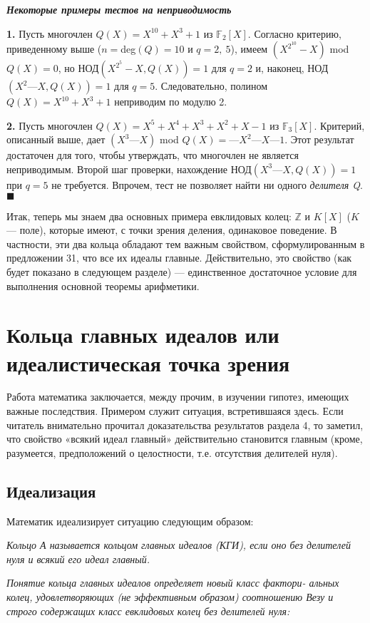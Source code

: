 \documentclass{mai_book}
\begin{document}
\noindent\textbf{\textit{Некоторые примеры тестов на неприводимость}}

\textbf{1.} Пусть многочлен $Q(X) = X^{10} + X^3 + 1$ из $\mathbb{F}_2[X]$. Согласно  
критерию, приведенному выше ($n = $deg$(Q) = 10$ и $q = 2,\: 5$), имеем 
$(X^{2^10} - X)$ mod $Q(X) = 0$, но НОД$(X^{2^5} - X,Q(X)) = 1$ для $q = 2$ и, 
наконец, НОД$(X^2 — X, Q(X)) = 1$ для $q = 5$. Следовательно, полином 
$Q(X) = X^{10} + X^3 + 1$ неприводим по модулю 2.
\newpage

\textbf{2.}  Пусть многочлен $Q(X) = X^5 + X^4 + X^3 + X^2 + X - 1$ из $\mathbb{F}_3[X]$. 
Критерий, описанный выше, дает $(X^3 — X)$ mod $Q(X) = —X^2 — X — 1$. 
Этот результат достаточен для того, чтобы утверждать, что  
многочлен не является неприводимым. Второй шаг проверки, нахождение 
НОД$(X^3 — X, Q(X)) = 1$ при $q = 5$ не требуется. Впрочем, тест не 
позволяет найти ни одного \textit{делителя Q}.\hspace{13.1cm}$\blacksquare$\newline


Итак, теперь мы знаем два основных примера евклидовых колец: $\mathbb{Z}$ 
и $K[X]$ ($K$ — поле), которые имеют, с точки зрения деления,  
одинаковое поведение. В частности, эти два кольца обладают тем важным 
свойством, сформулированным в предложении 31, что все их идеалы 
главные. Действительно, это свойство (как будет показано в следующем 
разделе) — единственное достаточное условие для выполнения  
основной теоремы арифметики.

\section{Кольца главных идеалов или идеалистическая точка зрения}
Работа математика заключается, между прочим, в изучении гипотез, 
имеющих важные последствия. Примером служит ситуация,  
встретившаяся здесь. Если читатель внимательно прочитал доказательства  
результатов раздела 4, то заметил, что свойство «всякий идеал главный» 
действительно становится главным (кроме, разумеется, предположений 
о целостности, т.е. отсутствия делителей нуля). 

\subsection{Идеализация}
Математик идеализирует ситуацию следующим образом:

\begin{determ}

\textit{Кольцо А называется кольцом главных идеалов (КГИ), если оно 
без делителей нуля и всякий его идеал главный.}
 
\textit{Понятие кольца главных идеалов определяет новый класс фактори- 
альных колец, удовлетворяющих (не эффективным образом)  
соотношению Везу и строго содержащих класс евклидовых колец без делителей 
нуля:} 
\end{determ}
\end{document}
